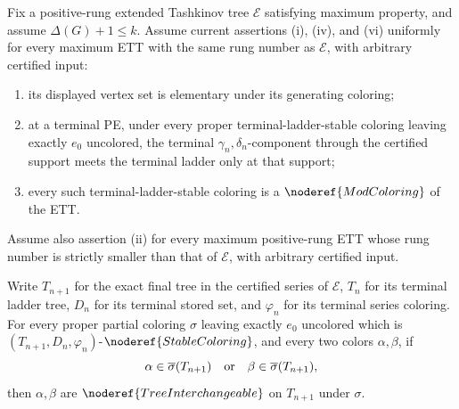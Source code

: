 \begin{lemma}
Fix a positive-rung extended Tashkinov tree \(\mathcal E\) satisfying
maximum property, and assume \(\Delta(G)+1\leq k\).  Assume current
assertions (i), (iv), and (vi) uniformly for every maximum ETT with the
same rung number as \(\mathcal E\), with arbitrary certified input:
\begin{enumerate}
\item its displayed vertex set is elementary under its generating
  coloring;
\item at a terminal PE, under every proper terminal-ladder-stable
  coloring leaving exactly \(e_0\) uncolored, the terminal
  \(\gamma_n,\delta_n\)-component through the certified support meets
  the terminal ladder only at that support;
\item every such terminal-ladder-stable coloring is a
  \(\noderef{ModColoring}\) of the ETT.
\end{enumerate}
Assume also assertion (ii) for every maximum positive-rung ETT whose
rung number is strictly smaller than that of \(\mathcal E\), with
arbitrary certified input.

Write \(T_{n+1}\) for the exact final tree in the certified series of
\(\mathcal E\), \(T_n\) for its terminal ladder tree, \(D_n\) for its
terminal stored set, and \(\varphi_n\) for its terminal series coloring.
For every proper partial coloring \(\sigma\) leaving exactly \(e_0\)
uncolored which is
\((T_{n+1},D_n,\varphi_n)\)-\(\noderef{StableColoring}\), and every two
colors \(\alpha,\beta\), if
\[
 \alpha\in\overline\sigma(T_{n+1})
 \quad\hbox{or}\quad
 \beta\in\overline\sigma(T_{n+1}),
\]
then \(\alpha,\beta\) are
\(\noderef{TreeInterchangeable}\) on \(T_{n+1}\) under \(\sigma\).
\end{lemma}
